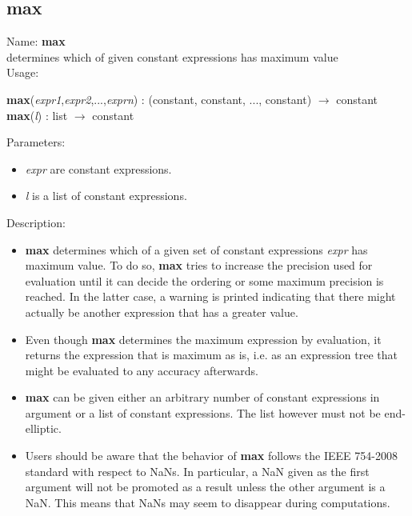 \subsection{max}
\label{labmax}
\noindent Name: \textbf{max}\\
determines which of given constant expressions has maximum value\\
\noindent Usage: 
\begin{center}
\textbf{max}(\emph{expr1},\emph{expr2},...,\emph{exprn}) : (\textsf{constant}, \textsf{constant}, ..., \textsf{constant}) $\rightarrow$ \textsf{constant}\\
\textbf{max}(\emph{l}) : \textsf{list} $\rightarrow$ \textsf{constant}\\
\end{center}
Parameters: 
\begin{itemize}
\item \emph{expr} are constant expressions.
\item \emph{l} is a list of constant expressions.
\end{itemize}
\noindent Description: \begin{itemize}

\item \textbf{max} determines which of a given set of constant expressions
   \emph{expr} has maximum value. To do so, \textbf{max} tries to increase the
   precision used for evaluation until it can decide the ordering or some
   maximum precision is reached. In the latter case, a warning is printed
   indicating that there might actually be another expression that has a
   greater value.

\item Even though \textbf{max} determines the maximum expression by evaluation, it 
   returns the expression that is maximum as is, i.e. as an expression
   tree that might be evaluated to any accuracy afterwards.

\item \textbf{max} can be given either an arbitrary number of constant
   expressions in argument or a list of constant expressions. The list
   however must not be end-elliptic.

\item Users should be aware that the behavior of \textbf{max} follows the IEEE
   754-2008 standard with respect to NaNs. In particular, a NaN given as
   the first argument will not be promoted as a result unless the other
   argument is a NaN. This means that NaNs may seem to disappear during
   computations.
\end{itemize}
